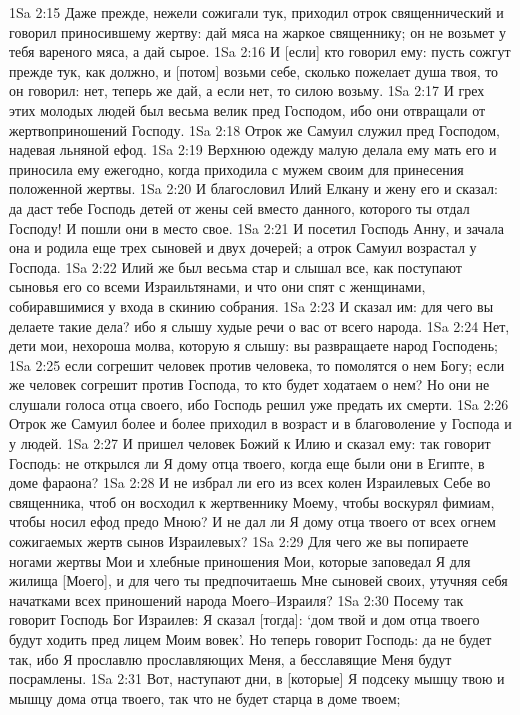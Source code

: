 1Sa 2:15  Даже прежде, нежели сожигали тук, приходил отрок священнический и говорил приносившему жертву: дай мяса на жаркое священнику; он не возьмет у тебя вареного мяса, а дай сырое.
1Sa 2:16  И [если] кто говорил ему: пусть сожгут прежде тук, как должно, и [потом] возьми себе, сколько пожелает душа твоя, то он говорил: нет, теперь же дай, а если нет, то силою возьму.
1Sa 2:17  И грех этих молодых людей был весьма велик пред Господом, ибо они отвращали от жертвоприношений Господу.
1Sa 2:18  Отрок же Самуил служил пред Господом, надевая льняной ефод.
1Sa 2:19  Верхнюю одежду малую делала ему мать его и приносила ему ежегодно, когда приходила с мужем своим для принесения положенной жертвы.
1Sa 2:20  И благословил Илий Елкану и жену его и сказал: да даст тебе Господь детей от жены сей вместо данного, которого ты отдал Господу! И пошли они в место свое.
1Sa 2:21  И посетил Господь Анну, и зачала она и родила еще трех сыновей и двух дочерей; а отрок Самуил возрастал у Господа.
1Sa 2:22  Илий же был весьма стар и слышал все, как поступают сыновья его со всеми Израильтянами, и что они спят с женщинами, собиравшимися у входа в скинию собрания.
1Sa 2:23  И сказал им: для чего вы делаете такие дела? ибо я слышу худые речи о вас от всего народа.
1Sa 2:24  Нет, дети мои, нехороша молва, которую я слышу: вы развращаете народ Господень;
1Sa 2:25  если согрешит человек против человека, то помолятся о нем Богу; если же человек согрешит против Господа, то кто будет ходатаем о нем? Но они не слушали голоса отца своего, ибо Господь решил уже предать их смерти.
1Sa 2:26  Отрок же Самуил более и более приходил в возраст и в благоволение у Господа и у людей.
1Sa 2:27  И пришел человек Божий к Илию и сказал ему: так говорит Господь: не открылся ли Я дому отца твоего, когда еще были они в Египте, в доме фараона?
1Sa 2:28  И не избрал ли его из всех колен Израилевых Себе во священника, чтоб он восходил к жертвеннику Моему, чтобы воскурял фимиам, чтобы носил ефод предо Мною? И не дал ли Я дому отца твоего от всех огнем сожигаемых жертв сынов Израилевых?
1Sa 2:29  Для чего же вы попираете ногами жертвы Мои и хлебные приношения Мои, которые заповедал Я для жилища [Моего], и для чего ты предпочитаешь Мне сыновей своих, утучняя себя начатками всех приношений народа Моего--Израиля?
1Sa 2:30  Посему так говорит Господь Бог Израилев: Я сказал [тогда]: `дом твой и дом отца твоего будут ходить пред лицем Моим вовек'. Но теперь говорит Господь: да не будет так, ибо Я прославлю прославляющих Меня, а бесславящие Меня будут посрамлены.
1Sa 2:31  Вот, наступают дни, в [которые] Я подсеку мышцу твою и мышцу дома отца твоего, так что не будет старца в доме твоем;
